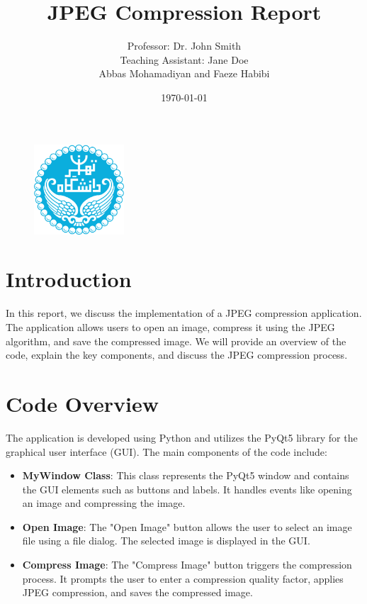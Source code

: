 \documentclass[a4paper,12pt]{article}
\title{JPEG Compression Report}
\author{Professor: Dr. John Smith \\ Teaching Assistant: Jane Doe\\Abbas Mohamadiyan and Faeze Habibi}
\date{\today}
\begin{document}
\begin{figure}[htbp]
  \centering
  \includegraphics[width=0.3\textwidth]{University_of_Tehran_logo.svg.png}
\end{figure}

\maketitle

\section{Introduction}
In this report, we discuss the implementation of a JPEG compression application. The application allows users to open an image, compress it using the JPEG algorithm, and save the compressed image. We will provide an overview of the code, explain the key components, and discuss the JPEG compression process.

\section{Code Overview}
The application is developed using Python and utilizes the PyQt5 library for the graphical user interface (GUI). The main components of the code include:

\begin{itemize}
  \item \textbf{MyWindow Class}: This class represents the PyQt5 window and contains the GUI elements such as buttons and labels. It handles events like opening an image and compressing the image.
  
  \item \textbf{Open Image}: The "Open Image" button allows the user to select an image file using a file dialog. The selected image is displayed in the GUI.
  
  \item \textbf{Compress Image}: The "Compress Image" button triggers the compression process. It prompts the user to enter a compression quality factor, applies JPEG compression, and saves the compressed image.
\end{itemize}
\end{document}
